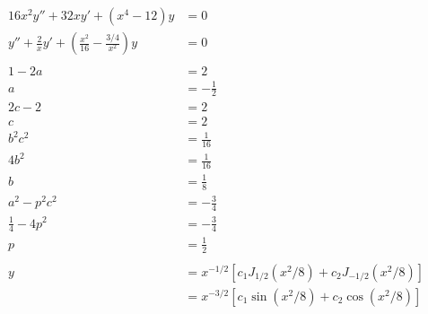 \documentclass{article}
\begin{document}
\begin{align*}
  16 x^2 y'' + 32 x y' + (x^4 - 12) y                                        & = 0                                                              \\
  y'' + \frac{2}{x} y' + \left( \frac{x^2}{16} - \frac{3 / 4}{x^2} \right) y & = 0                                                              \\ \\
  1 - 2 a                                                                    & = 2                                                              \\
  a                                                                          & = -\frac{1}{2}                                                   \\
  2 c - 2                                                                    & = 2                                                              \\
  c                                                                          & = 2                                                              \\
  b^2 c^2                                                                    & = \frac{1}{16}                                                   \\
  4 b^2                                                                      & = \frac{1}{16}                                                   \\
  b                                                                          & = \frac{1}{8}                                                    \\
  a^2 - p^2 c^2                                                              & = -\frac{3}{4}                                                   \\
  \frac{1}{4} - 4 p^2                                                        & = -\frac{3}{4}                                                   \\
  p                                                                          & = \frac{1}{2}                                                    \\ \\
  y                                                                          & = x^{-1 / 2} [c_1 J_{1 / 2} (x^2 / 8) + c_2 J_{-1 / 2}(x^2 / 8)] \\
                                                                             & = x^{-3 / 2} [c_1 \sin (x^2 / 8) + c_2 \cos (x^2 / 8)]
\end{align*}
\end{document}
